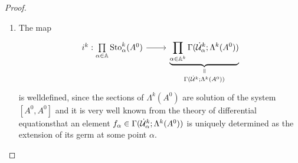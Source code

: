 \begin{proof}
  \begin{enumerate}
  \item The map
    \[ \begin{tikzcd}
      i^k: \underset{\alpha\in\A}\prod\Sto_\alpha^k(A^0)
      \rar &
      \underset{\Gamma(\dot\cU^k;\Lambda^k(A^0))}{%
        \underset{\text{\rotatebox[origin=c]{-90}{$=$}}}{%
          \underbrace{%
            \prod_{\alpha\in\A^k}\Gamma(\dot\cU_\alpha^k;\Lambda^k(A^0))
          }
        }}
    \end{tikzcd} \]
    is welldefined, since the sections of $\Lambda^k(A^0)$ are solution of
    the system $[A^0,A^0]$ and it is very well known from the theory of
    differential equations\TODO[source?] that an element
    $f_\alpha\in\Gamma(\dot{\mathcal{U}}_\alpha^k;\Lambda^k(A^0))$ is uniquely
    determined as the extension of its germ at some point $\alpha$.


\end{enumerate}
\end{proof}
